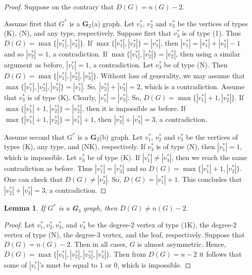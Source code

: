 \documentclass[12pt]{article}
\newtheorem{lemma}[theorem]{Lemma}
\begin{document}
\begin{proof} 
Suppose on the contrary that $D(G)= n(G)-2$. 

Assume first that $G^{\ast}$ is a {\bf G}$_2$(a) graph. Let $v^{\ast}_1$, $v^{\ast}_2$ and $v^{\ast}_3$ be the vertices of types (K), (N), and any type, respectively. Suppose first that $v^{\ast}_3$ 
is of type (1). Thus $D(G)=\max \{|v^{\ast}_1|, |v^{\ast}_2|\}$. 
If  $\max \{|v^{\ast}_1|, |v^{\ast}_2|\}= |v^{\ast}_1|$, then 
$|v^{\ast}_1|= |v^{\ast}_1|+|v^{\ast}_2| -1$ and so $|v^{\ast}_2|= 1$, a contradiction. 
If $\max \{|v^{\ast}_1|, |v^{\ast}_2|\}= |v^{\ast}_2|$, then using a similar argument as before, $|v^{\ast}_1|= 1$, a contradiction.
Let $v^{\ast}_3$ be of type (N). 
Then $D(G)=\max \{|v^{\ast}_1|, |v^{\ast}_2|, |v^{\ast}_3|\}$. Without loss of generality, we may assume that $\max \{|v^{\ast}_1|, |v^{\ast}_2|, |v^{\ast}_3|\}=|v^{\ast}_1|$. So, $|v^{\ast}_2|+|v^{\ast}_3|=2$, which is a contradiction. 
Assume that $v^{\ast}_3$ is of type (K). 
Clearly, $|v^{\ast}_1|=|v^{\ast}_3|$. So, $D(G)=\max \{|v^{\ast}_1|+1, |v^{\ast}_2|\}$. If $\max \{|v^{\ast}_1|+1, |v^{\ast}_2|\}=|v^{\ast}_2|$, then it is impossible as before. If $\max \{|v^{\ast}_1|+1, |v^{\ast}_2|\}=|v^{\ast}_1|+1$, then $|v^{\ast}_2|+ |v^{\ast}_3|=3$, a contradiction. 

Assume second that $G^{\ast}$ is a {\bf G}$_2$(b) graph. Let $v^{\ast}_1$, $v^{\ast}_2$ and $v^{\ast}_3$ be the vertices of types (K), any type, and (NK), respectively. 
If $v^{\ast}_3$ is of type (N), then $|v^{\ast}_1|= 1$, which is impossible. 
Let $v^{\ast}_3$ be of type (K). If $|v^{\ast}_1|\neq |v^{\ast}_3|$, 
then we reach the same contradiction as before. Thus 
$|v^{\ast}_1| = |v^{\ast}_3|$ and so 
$D(G)=\max \{|v^{\ast}_1|+1, |v^{\ast}_2|\}$. One can check that 
$D(G)\neq|v^{\ast}_2|$. So, $D(G)=|v^{\ast}_1|+1$. 
This concludes that $|v^{\ast}_2|+ |v^{\ast}_3|=3$, a contradiction.  
\end{proof}

\begin{lemma}\label{G3}
If $G^{\ast}$ is a {\bf G}$_3$ graph, then $D(G)\neq n(G)-2$. 
\end{lemma}

\begin{proof} 
Let $v^{\ast}_1, v^{\ast}_2, v^{\ast}_3$, and $v^{\ast}_4$ be the degree-$2$ vertex of type (1K), the degree-$2$ vertex of type (N), the degree-$3$ vertex, and the leaf, respectively. Suppose that $D(G)= n(G)-2$. Then in all cases, $G$ is almost asymmetric. Hence, $D(G)=\max \{|v^{\ast}_1|, |v^{\ast}_2|, |v^{\ast}_3|, |v^{\ast}_4|\}$. Then from $D(G)=n-2$ it follows that some of $|v^{\ast}_i|$'s must be equal to $1$ or $0$, which is impossible. 
\end{proof}
\end{document}
